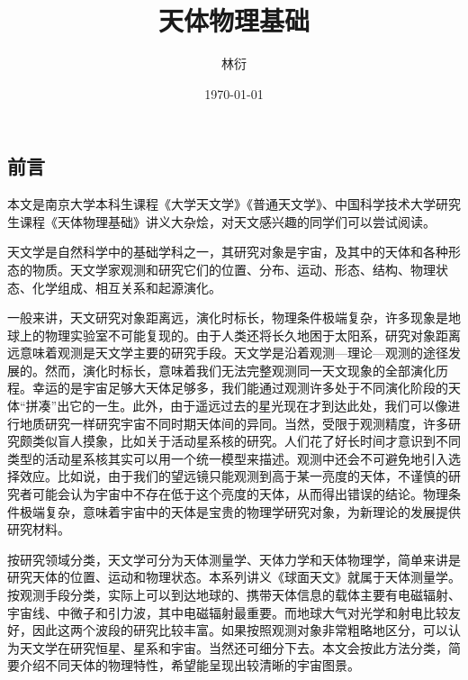 \documentclass[11pt, a4paper, oneside, onecolumn]{ctexart}
\title{天体物理基础}
\author{林衍}
\date{\today}
\numberwithin{equation}{subsection}
\begin{document}
\maketitle
\subsection*{前言}
本文是南京大学本科生课程《大学天文学》《普通天文学》、中国科学技术大学研究生课程《天体物理基础》讲义大杂烩，对天文感兴趣的同学们可以尝试阅读。

天文学是自然科学中的基础学科之一，其研究对象是宇宙，及其中的天体和各种形态的物质。天文学家观测和研究它们的位置、分布、运动、形态、结构、物理状态、化学组成、相互关系和起源演化。

一般来讲，天文研究对象距离远，演化时标长，物理条件极端复杂，许多现象是地球上的物理实验室不可能复现的。由于人类还将长久地困于太阳系，研究对象距离远意味着观测是天文学主要的研究手段。天文学是沿着观测—理论—观测的途径发展的。然而，演化时标长，意味着我们无法完整观测同一天文现象的全部演化历程。幸运的是宇宙足够大天体足够多，我们能通过观测许多处于不同演化阶段的天体“拼凑”出它的一生。此外，由于遥远过去的星光现在才到达此处，我们可以像进行地质研究一样研究宇宙不同时期天体间的异同。当然，受限于观测精度，许多研究颇类似盲人摸象，比如关于活动星系核的研究。人们花了好长时间才意识到不同类型的活动星系核其实可以用一个统一模型来描述。观测中还会不可避免地引入选择效应。比如说，由于我们的望远镜只能观测到高于某一亮度的天体，不谨慎的研究者可能会认为宇宙中不存在低于这个亮度的天体，从而得出错误的结论。物理条件极端复杂，意味着宇宙中的天体是宝贵的物理学研究对象，为新理论的发展提供研究材料。

按研究领域分类，天文学可分为天体测量学、天体力学和天体物理学，简单来讲是研究天体的位置、运动和物理状态。本系列讲义《球面天文》就属于天体测量学。按观测手段分类，实际上可以到达地球的、携带天体信息的载体主要有电磁辐射、宇宙线、中微子和引力波，其中电磁辐射最重要。而地球大气对光学和射电比较友好，因此这两个波段的研究比较丰富。如果按照观测对象非常粗略地区分，可以认为天文学在研究恒星、星系和宇宙。当然还可细分下去。本文会按此方法分类，简要介绍不同天体的物理特性，希望能呈现出较清晰的宇宙图景。

\newpage
\tableofcontents

\newpage

%
%
%
%
%

\printbibliography
\end{document}
